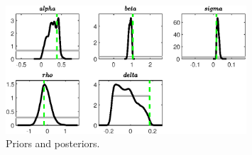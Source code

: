  
\begin{figure}[H]
\centering
\includegraphics[width=0.80\textwidth]{RBC_kz/Output/RBC_kz_PriorsAndPosteriors1}
\caption{Priors and posteriors.}\label{Fig:PriorsAndPosteriors:1}
\end{figure}
 
